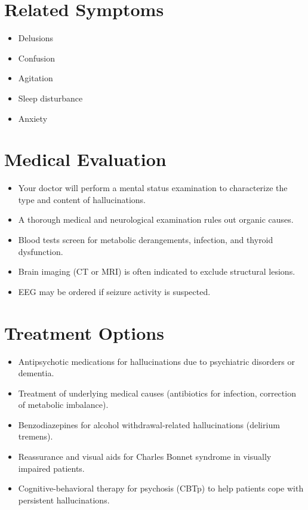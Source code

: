 \section*{Related Symptoms}
\begin{itemize}
  \item Delusions
  \item Confusion
  \item Agitation
  \item Sleep disturbance
  \item Anxiety
\end{itemize}

\section*{Medical Evaluation}
\begin{itemize}
  \item Your doctor will perform a mental status examination to characterize the type and content of hallucinations.
  \item A thorough medical and neurological examination rules out organic causes.
  \item Blood tests screen for metabolic derangements, infection, and thyroid dysfunction.
  \item Brain imaging (CT or MRI) is often indicated to exclude structural lesions.
  \item EEG may be ordered if seizure activity is suspected.
\end{itemize}

\section*{Treatment Options}
\begin{itemize}
  \item Antipsychotic medications for hallucinations due to psychiatric disorders or dementia.
  \item Treatment of underlying medical causes (antibiotics for infection, correction of metabolic imbalance).
  \item Benzodiazepines for alcohol withdrawal-related hallucinations (delirium tremens).
  \item Reassurance and visual aids for Charles Bonnet syndrome in visually impaired patients.
  \item Cognitive-behavioral therapy for psychosis (CBTp) to help patients cope with persistent hallucinations.
\end{itemize}

